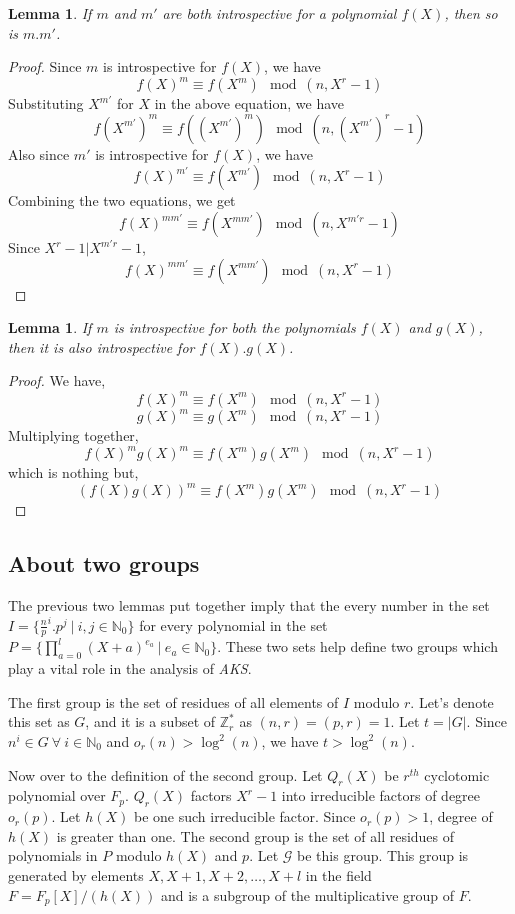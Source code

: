 \documentclass[11pt]{article}
\newtheorem{lemma}[theorem]{Lemma}
\begin{document}
\begin{lemma}
\label{lemma:IntrospectiveLemma1}
If $m$ and $m'$ are both introspective for a polynomial $f(X)$, then so is $m . m'$.
\end{lemma}
\begin{proof}
Since $m$ is introspective for $f(X)$, we have
\[f(X)^m \equiv f(X^m) \mod (n, X^r-1)\]
Substituting $X^{m'}$ for $X$ in the above equation, we have
\[f(X^{m'})^m \equiv f((X^{m'})^m) \mod (n, (X^{m'})^r-1)\]
Also since $m'$ is introspective for $f(X)$, we have
\[f(X)^{m'} \equiv f(X^{m'}) \mod (n, X^r-1)\]
Combining the two equations, we get
\[f(X)^{mm'} \equiv f(X^{mm'}) \mod (n, X^{m'r}-1)\]
Since $X^{r}-1 | X^{m'r}-1$,
\[f(X)^{mm'} \equiv f(X^{mm'}) \mod (n, X^r-1)\]
\end{proof}
\begin{lemma}
\label{lemma:IntrospectiveLemma2}
If $m$ is introspective for both the polynomials $f(X)$ and $g(X)$, then it is also introspective for $f(X) . g(X)$.
\end{lemma}
\begin{proof}
We have,
\[f(X)^m \equiv f(X^m) \mod (n, X^r-1)\]
\[g(X)^m \equiv g(X^m) \mod (n, X^r-1)\]
Multiplying together,
\[f(X)^mg(X)^m \equiv f(X^m)g(X^m) \mod (n, X^r-1)\]
which is nothing but,
\[(f(X)g(X))^m \equiv f(X^m)g(X^m) \mod (n, X^r-1)\]
\end{proof}

\subsection{About two groups}
The previous two lemmas put together imply that the every number in the set $I = \{\frac{n}{p}^i.p^j\ |\ i,j \in \mathbb{N}_0\}$ for every polynomial in the set $P = \{\prod_{a=0}^{l}{(X+a)^{e_a}}\ |\ e_a \in \mathbb{N}_0\}$. These two sets help define two groups which play a vital role in the analysis of \emph{AKS}.

The first group is the set of residues of all elements of $I$ modulo $r$. Let's denote this set as $G$, and it is a subset of $\mathbb{Z}_r^*$ as $(n,r) = (p,r) = 1$. Let $t = |G|$. Since $n^i \in G \ \forall \ i \in \mathbb{N}_0$ and $o_r(n) > \log^2(n)$, we have $t > \log^2(n)$.

Now over to the definition of the second group. Let $Q_r(X)$ be $r^{th}$ cyclotomic polynomial over $F_p$. $Q_r(X)$ factors $X^r-1$ into irreducible factors of degree $o_r(p)$. Let $h(X)$ be one such irreducible factor. Since $o_r(p) > 1$, degree of $h(X)$ is greater than one. The second group is the set of all residues of polynomials in $P$ modulo $h(X)$ and $p$. Let $\mathcal{G}$ be this group. This group is generated by elements $X, X + 1, X + 2, \dots, X + l$ in the field $F = F_p[X]/(h(X))$ and is a subgroup of the multiplicative group of $F$.
\end{document}
